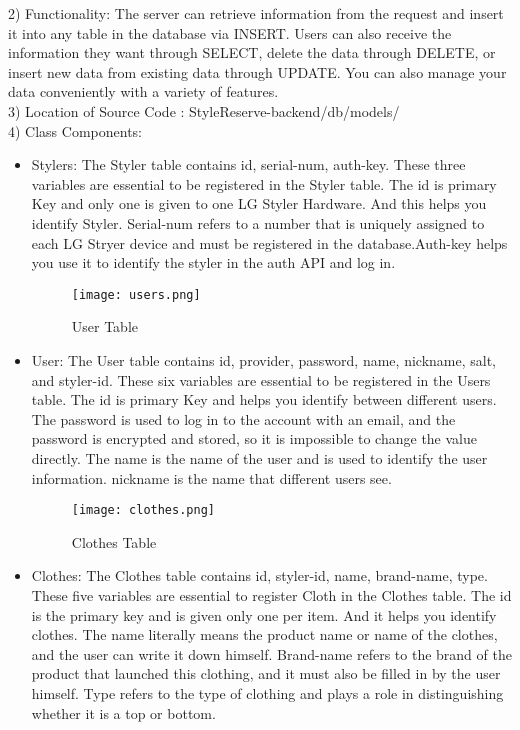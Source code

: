 \documentclass[conference]{IEEEtran}
\begin{document}
2) Functionality: The server can retrieve information from the request and insert it into any table in the database via INSERT. Users can also receive the information they want through SELECT, delete the data through DELETE, or insert new data from existing data through UPDATE. You can also manage your data conveniently with a variety of features.\\

3) Location of Source Code : StyleReserve-backend/db/models/\\

4) Class Components:
\begin{itemize}

    \begin{figure}[htbp]
    \centerline{\texttt{[image: stylers.png]}}
    \label{fig}
    \caption{Styler Table}
    \end{figure}
    \item Stylers: The Styler table contains id, serial-num, auth-key. These three variables are essential to be registered in the Styler table. The id is primary Key and only one is given to one LG Styler Hardware. And this helps you identify Styler. Serial-num refers to a number that is uniquely assigned to each LG Stryer device and must be registered in the database.Auth-key helps you use it to identify the styler in the auth API and log in.
    
    \newpage
    \begin{figure}[htbp]
    \centerline{\texttt{[image: users.png]}}
    \label{fig}
    \caption{User Table}
    \end{figure}
    \item User: The User table contains id, provider, password, name, nickname, salt, and styler-id. These six variables are essential to be registered in the Users table. The id is primary Key and helps you identify between different users. The password is used to log in to the account with an email, and the password is encrypted and stored, so it is impossible to change the value directly. The name is the name of the user and is used to identify the user information. nickname is the name that different users see.
    
    \begin{figure}[htbp]
    \centerline{\texttt{[image: clothes.png]}}
    \label{fig}
    \caption{Clothes Table}
    \end{figure}
    \item Clothes: The Clothes table contains id, styler-id, name, brand-name, type. These five variables are essential to register Cloth in the Clothes table. The id is the primary key and is given only one per item. And it helps you identify clothes. The name literally means the product name or name of the clothes, and the user can write it down himself. Brand-name refers to the brand of the product that launched this clothing, and it must also be filled in by the user himself. Type refers to the type of clothing and plays a role in distinguishing whether it is a top or bottom.
    

\end{itemize}
\end{document}
